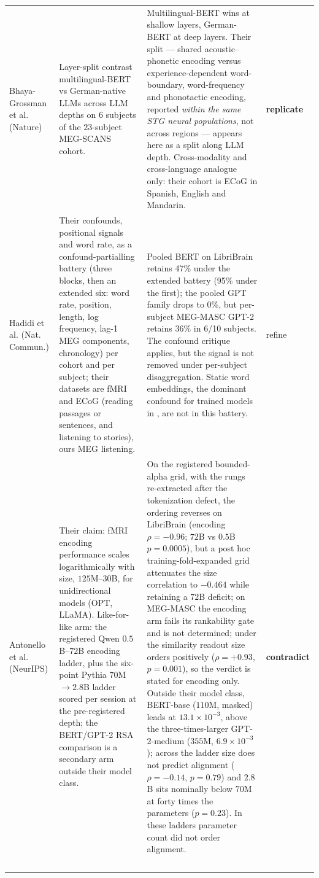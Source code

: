 \documentclass{article}
\begin{document}
\begin{longtable}{@{}p{2.1cm} p{3.8cm} p{5.1cm} p{1.5cm}@{}}
Bhaya-Grossman et al. (Nature) & Layer-split contrast multilingual-BERT vs German-native LLMs across LLM depths on $6$ subjects of the $23$-subject MEG-SCANS cohort. & Multilingual-BERT wins at shallow layers, German-BERT at deep layers. Their split --- shared acoustic--phonetic encoding versus experience-dependent word-boundary, word-frequency and phonotactic encoding, reported \emph{within the same STG neural populations}, not across regions --- appears here as a split along LLM depth. Cross-modality and cross-language analogue only: their cohort is ECoG in Spanish, English and Mandarin. & \textbf{replicate} \\ \addlinespace
Hadidi et al. (Nat. Commun.) & Their confounds, positional signals and word rate, as a confound-partialling battery (three blocks, then an extended six: word rate, position, length, log frequency, lag-1 MEG components, chronology) per cohort and per subject; their datasets are fMRI and ECoG (reading passages or sentences, and listening to stories), ours MEG listening. & Pooled BERT on LibriBrain retains 47\% under the extended battery (95\% under the first); the pooled GPT family drops to 0\%, but per-subject MEG-MASC GPT-2 retains 36\% in 6/10 subjects. The confound critique applies, but the signal is not removed under per-subject disaggregation. Static word embeddings, the dominant confound for trained models in \citet{lai2025illusions}, are not in this battery. & refine \\ \addlinespace
Antonello et al. (NeurIPS) & Their claim: fMRI encoding performance scales logarithmically with size, $125$M--$30$B, for unidirectional models (OPT, LLaMA). Like-for-like arm: the registered Qwen $0.5$B--$72$B encoding ladder, plus the six-point Pythia $70$M$\to$$2.8$B ladder scored per session at the pre-registered depth; the BERT/GPT-2 RSA comparison is a secondary arm outside their model class. & On the registered bounded-alpha grid, with the rungs re-extracted after the tokenization defect, the ordering reverses on LibriBrain (encoding $\rho=-0.96$; $72$B vs $0.5$B $p=0.0005$), but a post hoc training-fold-expanded grid attenuates the size correlation to $-0.464$ while retaining a $72$B deficit; on MEG-MASC the encoding arm fails its rankability gate and is not determined; under the similarity readout size orders positively ($\rho=+0.93$, $p=0.001$), so the verdict is stated for encoding only. Outside their model class, BERT-base ($110$M, masked) leads at $13.1\times10^{-3}$, above the three-times-larger GPT-2-medium ($355$M, $6.9\times10^{-3}$); across the ladder size does not predict alignment ($\rho = -0.14$, $p = 0.79$) and $2.8$B sits nominally below $70$M at forty times the parameters ($p = 0.23$). In these ladders parameter count did not order alignment. & \textbf{contradict} \\ \addlinespace
$$
\end{longtable}
\end{document}
